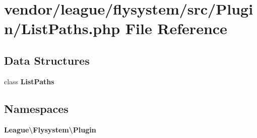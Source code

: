 \section{vendor/league/flysystem/src/\+Plugin/\+List\+Paths.php File Reference}
\label{_list_paths_8php}
\subsection*{Data Structures}
\begin{DoxyCompactItemize}
\item 
class {\bf List\+Paths}
\end{DoxyCompactItemize}
\subsection*{Namespaces}
\begin{DoxyCompactItemize}
\item 
 {\bf League\textbackslash{}\+Flysystem\textbackslash{}\+Plugin}
\end{DoxyCompactItemize}
